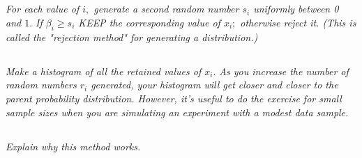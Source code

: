 \documentclass{article}
\begin{document}
\subsection{}
\textit{For each value of $i,$ generate a second random number $s_{i}$ uniformly between 0 and $1 .$ If $\beta_{i} \geq s_{i}$ KEEP the corresponding value of $x_{i} ;$ otherwise reject it. (This is called the "rejection method" for generating a distribution.)}



\subsection{}
\textit{Make a histogram of all the retained values of $x_{i} .$ As you increase the number of random numbers $r_{i}$ generated, your histogram will get closer and closer to the parent probability distribution. However, it's useful to do the exercise for small sample sizes when you are simulating an experiment with a modest data sample.}


\subsection{}
\textit{Explain why this method works.}
\end{document}
